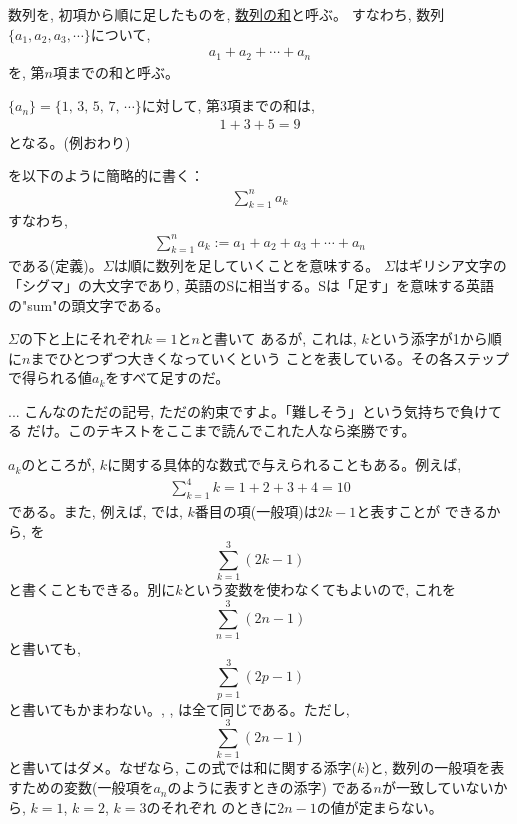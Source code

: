 数列を, 初項から順に足したものを, \underline{数列の和}と呼ぶ。
すなわち, 数列$\{a_1, a_2, a_3, \cdots\}$について, 
\begin{eqnarray}a_1+a_2+\cdots+a_n\label{eq:sum_series}\end{eqnarray}
を, 第$n$項までの和と呼ぶ。

\begin{exmpl} $\{a_n\}=\{1,\, 3,\, 5,\, 7,\, \cdots\}$に対して, 第3項までの和は, 
\begin{eqnarray}
1+3+5=9\label{eq:series_S3}
\end{eqnarray}
となる。(例おわり)\end{exmpl}

を以下のように簡略的に書く：
\begin{eqnarray}\sum_{k=1}^n a_k\end{eqnarray}
すなわち, 
\begin{eqnarray}\sum_{k=1}^n a_k :=a_1+a_2+a_3+\cdots+a_n\end{eqnarray}
である(定義)。$\Sigma$は順に数列を足していくことを意味する。
$\Sigma$はギリシア文字の「シグマ」の大文字であり, 
英語のSに相当する。Sは「足す」を意味する英語の"sum"の頭文字である。

$\Sigma$の下と上にそれぞれ$k=1$と$n$と書いて
あるが, これは, $k$という添字が1から順に$n$までひとつずつ大きくなっていくという
ことを表している。その各ステップで得られる値$a_k$をすべて足すのだ。

\begin{faq}{\small{}
... こんなのただの記号, ただの約束ですよ。「難しそう」という気持ちで負けてる
だけ。このテキストをここまで読んでこれた人なら楽勝です。}\end{faq}

$a_k$のところが, $k$に関する具体的な数式で与えられることもある。例えば, 
\begin{eqnarray}\sum_{k=1}^4 k = 1+2+3+4 = 10\end{eqnarray}
である。また, 例えば, では, $k$番目の項(一般項)は$2k-1$と表すことが
できるから, を
\begin{equation}
\sum_{k=1}^3(2k-1)\label{eq:series_S32}
\end{equation}
と書くこともできる。別に$k$という変数を使わなくてもよいので, これを
\begin{equation}\sum_{n=1}^3(2n-1)\label{eq:series_S34}\end{equation}
と書いても, 
\begin{equation}\sum_{p=1}^3(2p-1)\label{eq:series_S36}\end{equation}
と書いてもかまわない。, , 
は全て同じである。ただし, 
\begin{equation}\sum_{k=1}^3(2n-1)\label{eq:series_S38}\end{equation}
と書いてはダメ。なぜなら, この式では和に関する添字($k$)と, 
数列の一般項を表すための変数(一般項を$a_n$のように表すときの添字)
である$n$が一致していないから, $k=1$, $k=2$, $k=3$のそれぞれ
のときに$2n-1$の値が定まらない。

